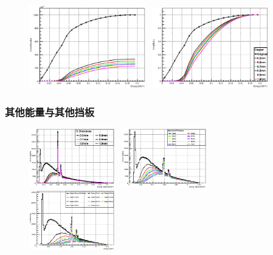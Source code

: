\documentclass{beamer}
\begin{document}
\begin{CJK*}{UTF8}{gkai}
\begin{frame}
\begin{figure}[ht]
      \includegraphics[width=0.45\textwidth]{200keVElectronXrayCopperDistribution.eps}~
      \includegraphics[width=0.45\textwidth]{200keVElectronXrayCopperDistributionRatio.eps}
    \end{figure}
  \end{frame}
  \begin{frame}\frametitle{其他能量与其他挡板}
    \vskip -0.8cm
    \begin{figure}[ht]
      \includegraphics[width=0.33\textwidth]{EnergyAfterTiApron.eps}~
      \includegraphics[width=0.33\textwidth]{EnergyAfterAluminumApron.eps}~
      \includegraphics[width=0.33\textwidth]{EnergyAfterCopperApron.eps}


\end{figure}
\end{frame}
\end{CJK*}
\end{document}
